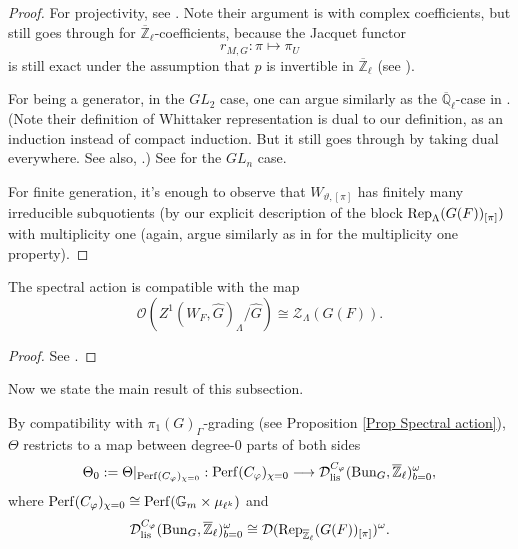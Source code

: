 \begin{proof}
	For projectivity, see \cite[Section 4]{aizenbud2022strong}. Note their argument is with complex coefficients, but still goes through for $\overline{\mathbb{Z}}_{\ell}$-coefficients, because the Jacquet functor 
	$$r_{M, G}: \pi \mapsto \pi_U$$
	is still exact under the assumption that $p$ is invertible in $\overline{\mathbb{Z}}_{\ell}$ (see \cite[Section II.2.1]{vigneras1996representations}).
	
	For being a generator, in the $GL_2$ case, one can argue similarly as the $\overline{\mathbb{Q}}_{\ell}$-case in \cite[Section 39]{bushnell2006local}. (Note their definition of Whittaker representation is dual to our definition, as an induction instead of compact induction. But it still goes through by taking dual everywhere. See also, \cite[Section 2.1 and others]{bushnell2003generalized}.) See \cite{bushnell2003generalized} for the $GL_n$ case.
	
	For finite generation, it's enough to observe that $W_{\vartheta, [\pi]}$ has finitely many irreducible subquotients (by our explicit description of the block $\operatorname{\operatorname{Rep}}_{\Lambda}(G(F))_{[\pi]})$ with multiplicity one (again, argue similarly as in \cite[Section 39]{bushnell2006local} for the multiplicity one property).
\end{proof}

\begin{lemma}\label{Lemma Spectral action Bern center}
	The spectral action is compatible with the map 
	$$\mathcal{O}(Z^1(W_F, \hat{G})_{\Lambda}/\hat{G}) \cong \mathcal{Z}_{\Lambda}(G(F)).$$
\end{lemma}

\begin{proof}
	See \cite[Section 5]{zou2022categorical}.
\end{proof}

Now we state the main result of this subsection.

By compatibility with $\pi_1(G)_{\Gamma}$-grading (see Proposition \ref{Prop Spectral action}), $\Theta$ restricts to a map between degree-$0$ parts of both sides
$$\Theta_0:=\Theta|_{\operatorname{\operatorname{Perf}}(C_{\varphi})_{\chi=0}}: \operatorname{\operatorname{Perf}}(C_{\varphi})_{\chi=0} \longrightarrow \mathcal{D}_{\operatorname{\operatorname{lis}}}^{C_{\varphi}}(\operatorname{\operatorname{Bun}}_G, \overline{\mathbb{Z}}_{\ell})^{\omega}_{b=0},$$
where $\operatorname{\operatorname{Perf}}(C_{\varphi})_{\chi=0} \cong \operatorname{\operatorname{Perf}}(\mathbb{G}_m \times \mu_{\ell^k})$ and 
$$\mathcal{D}_{\operatorname{\operatorname{lis}}}^{C_{\varphi}}(\operatorname{\operatorname{Bun}}_G, \overline{\mathbb{Z}}_{\ell})^{\omega}_{b=0} \cong \mathcal{D}(\operatorname{\operatorname{Rep}}_{\overline{\mathbb{Z}}_{\ell}}(G(F))_{[\pi]})^{\omega}.$$

